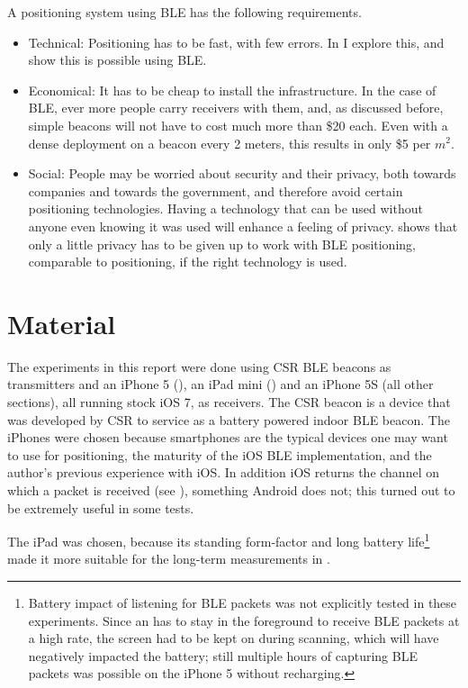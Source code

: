 A positioning system using BLE has the following requirements.
\begin{itemize}
    \item Technical: Positioning has to be fast, with few errors. In  I explore this, and show this is possible using BLE.
    \item Economical: It has to be cheap to install the infrastructure. In the case of BLE, ever more people carry receivers with them, and, as discussed before, simple beacons will not have to cost much more than \$20 each.
        Even with a dense deployment on a beacon every 2 meters, this results in only \$5 per $m^2$.
    \item Social: People may be worried about security and their privacy, both towards companies and towards the government, and therefore avoid certain positioning technologies.
        Having a technology that can be used without anyone even knowing it was used will enhance a feeling of privacy.
         shows that only a little privacy has to be given up to work with BLE positioning, comparable to \wifi positioning, if the right technology is used.
\end{itemize}

\section{Material}
The experiments in this report were done using CSR BLE beacons as transmitters and an iPhone 5 (), an iPad mini () and an iPhone 5S (all other sections), all running stock iOS 7, as receivers.
The CSR beacon is a device that was developed by CSR to service as a battery powered indoor BLE beacon.
The iPhones were chosen because smartphones are the typical devices one may want to use for positioning, the maturity of the iOS BLE implementation, and the author's previous experience with iOS.
In addition iOS returns the channel on which a packet is received (see ), something Android does not; this turned out to be extremely useful in some tests.

The iPad was chosen, because its standing form-factor and long battery life\footnote{Battery impact of listening for BLE packets was not explicitly tested in these experiments. Since an \app has to stay in the foreground to receive BLE packets at a high rate, the screen had to be kept on during scanning, which will have negatively impacted the battery; still multiple hours of capturing BLE packets was possible on the iPhone 5 without recharging.} made it more suitable for the long-term measurements in .

